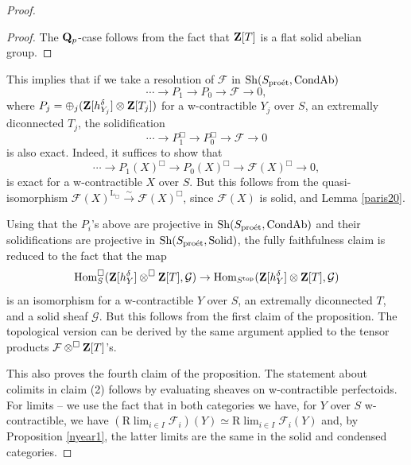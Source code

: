 \documentclass[10pt]{amsart}
\theoremstyle{definition}
\theoremstyle{remark}
\newcommand{\proeet}{\operatorname{pro\acute{e}t} }
\newcommand{\Hom}{{\rm{Hom}} }
\newcommand{\LL}{\operatorname{L} }
\newcommand{\sff}{{\mathcal{F}}}
\newcommand{\sg}{{\mathcal{G}}}
\numberwithin{equation}{section}
\def\R{{\mathrm R}}
\def\Q{{\bf Q}} \def\Z{{\bf Z}}
\numberwithin{equation}{section}
\begin{document}
\begin{proof}
\begin{proof}
   The $\Q_p$-case follows from the fact that $\Z[T]$ is a flat solid abelian group.
\end{proof}
This implies that if we take a resolution of $\sff$ in ${\rm Sh}(S_{\proeet}, {\rm CondAb})$
$$
\cdots \to P_1\to P_0\to \sff\to 0,
$$
where $P_j=\oplus_j(\Z[h^{\delta}_{Y_j}]\otimes\Z[T_j])$ for a w-contractible $Y_j$ over $S$, an extremally diconnected $T_j$, the solidification
$$
\cdots \to P_1^{\Box}\to P_0^{\Box}\to \sff\to 0
$$
is also exact.  Indeed, it suffices to show that 
$$
\cdots \to P_1(X)^{\Box}\to P_0(X)^{\Box}\to \sff(X)^{\Box}\to 0,
$$
is exact for a w-contractible $X$ over $S$. But this follows from the quasi-isomorphism $\sff(X)^{\LL_{\Box}}\stackrel{\sim}{\to} \sff(X)^{\Box}$, since $\sff(X)$ is solid,  and Lemma \ref{paris20}.

Using  that the $P_i$'s above are projective in   ${\rm Sh}(S_{\proeet}, {\rm CondAb})$ and their solidifications are projective in ${\rm Sh}(S_{\proeet}, {\rm Solid})$, the fully faithfulness claim is   reduced to the fact that the map
\begin{equation}\label{koczkodan5}
\Hom^{\Box}_{S}(\Z[h^{\delta}_Y]\otimes^{\Box}\Z[T],\sg  ) \to \Hom_{S^{\rm top}}(\Z[h^{\delta}_Y]\otimes\Z[T],\sg  )
\end{equation}
is an isomorphism for a w-contractible $Y$ over $S$, an extremally diconnected $T$, and a solid sheaf $\sg$. But this follows from the first claim of the proposition. The topological version can be derived by the same argument applied to the tensor products $\sff\otimes^{\Box}\Z[T]$'s. 


This also proves the fourth claim of the proposition. The statement about  colimits  in claim (2) follows by evaluating sheaves on w-contractible perfectoids. For limits -- 
we use the fact that in both categories we have, for $Y$ over $S$ w-contractible, we have  $(\R\lim_{i\in I}\sff_i)(Y)\simeq \R\lim_{i\in I}\sff_i(Y)$ and, by Proposition \ref{nyear1}, the latter limits are the same in the solid and condensed categories.





\end{proof}
\end{document}
